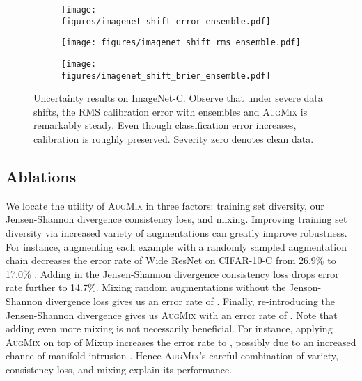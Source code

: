 \documentclass{article} \usepackage{iclr2020_conference,times}
\begin{document}
\begin{figure}[ht]
\begin{subfigure}{.33\textwidth}
    \centering
    \texttt{[image: figures/imagenet\_shift\_error\_ensemble.pdf]}
\end{subfigure}\begin{subfigure}{.33\textwidth}
    \centering
    \texttt{[image: figures/imagenet\_shift\_rms\_ensemble.pdf]}
\end{subfigure}\begin{subfigure}{.33\textwidth}
    \centering
    \texttt{[image: figures/imagenet\_shift\_brier\_ensemble.pdf]}
\end{subfigure}\caption{Uncertainty results on ImageNet-C. Observe that under severe data shifts, the RMS calibration error with ensembles and \textsc{AugMix} is remarkably steady. Even though classification error increases, calibration is roughly preserved. Severity zero denotes clean data.
}\label{fig:across-severities:imagenet}
\vspace{-5pt}
\end{figure}




\subsection{Ablations}\label{sec:ablations}
We locate the utility of \textsc{AugMix} in three factors: training set diversity, our Jensen-Shannon divergence consistency loss, and mixing. Improving training set diversity via increased variety of augmentations can greatly improve robustness. For instance, augmenting each example with a randomly sampled augmentation chain decreases the error rate of Wide ResNet on CIFAR-10-C from 26.9\% to 17.0\% . Adding in the Jensen-Shannon divergence consistency loss drops error rate further to  14.7\%. Mixing random augmentations without the Jenson-Shannon divergence loss gives us an error rate of . Finally, re-introducing the Jensen-Shannon divergence gives us \textsc{AugMix} with an error rate of . Note that adding even more mixing is not necessarily beneficial. For instance, applying \textsc{AugMix} on top of Mixup increases the error rate to , possibly due to an increased chance of manifold intrusion \citep{GuoMixup}. Hence \textsc{AugMix}'s careful combination of variety, consistency loss, and mixing explain its performance.
\end{document}
